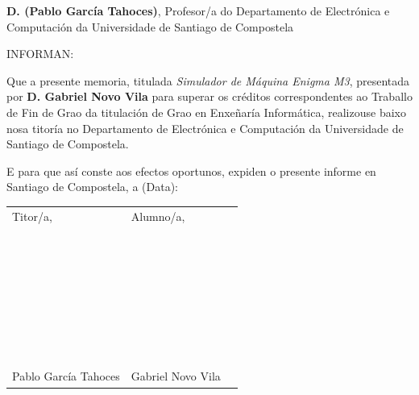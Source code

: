 \pagestyle{plain}

\vspace{1cm}
{\bf D. (Pablo García Tahoces)}, Profesor/a do Departamento de Electrónica e Computación da Universidade de Santiago de Compostela

\vspace{1cm}
INFORMAN:

\vspace{1cm}
Que a presente memoria, titulada {\it Simulador de Máquina Enigma M3}, presentada por {\bf D. Gabriel Novo Vila} para superar os créditos correspondentes ao Traballo de Fin de Grao da titulación de Grao en Enxeñaría Informática, realizouse baixo nosa titoría no Departamento de Electrónica e Computación da Universidade de Santiago de Compostela.

\vspace{1cm}
E para que así conste aos efectos oportunos, expiden o presente informe en Santiago de Compostela, a (Data):

\vspace{2cm}
\begin{tabular}{lll}
	Titor/a, & Alumno/a, \\
	~ \\
	~ \\
	~ \\
	~ \\
	~ \\
	~ \\
	~ \\
	Pablo García Tahoces & Gabriel Novo Vila
\end{tabular}
